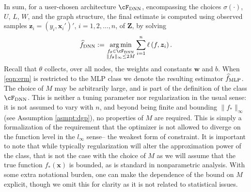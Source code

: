 \documentclass[11pt]{article}
\numberwithin{equation}{section}
\theoremstyle{definition}
\DeclareMathOperator*{\argmin}{arg\,min}
\newcommand{\R}{\mathbb{R}}
\def\argmin{\operatornamewithlimits{arg\,min}}
\newcommand{\deq}{:=}
\newcommand{\bz}{\bm{z}}
\newcommand{\bZ}{\bm{Z}}
\newcommand{\bw}{\bm{w}}
\newcommand{\bx}{\bm{x}}
\begin{document}
In sum, for a user-chosen architecture $\cF_{\rm DNN}$, encompassing the choices $\sigma(\cdot)$, $U$, $L$, $W$, and the graph structure, the final estimate is computed using observed samples $\bz_i = (y_i, \bx_i')'$, $i=1,2, \ldots, n$, of $\bZ$, by solving
\begin{align}
	\label{eqn:erm}
	\widehat{f}_{\rm DNN} \deq \argmin_{\substack{f_\theta \in \cF_{\rm DNN} \\ \| f_\theta \|_\infty \leq 2M}}  \sum_{i=1}^n \ell\left(f, \bz_i\right).
\end{align}
Recall that $\theta$ collects, over all nodes, the weights and constants $\bw$ and $b$. When \eqref{eqn:erm} is restricted to the MLP class we denote the resulting estimator $\widehat{f}_{\rm MLP}$. The choice of $M$ may be arbitrarily large, and is part of the definition of the class $\cF_{\rm DNN}$. This is neither a tuning parameter nor regularization in the usual sense: it is not assumed to vary with $n$, and beyond being finite and bounding $\|f_*\|_\infty$ (see Assumption \ref{asmpt:dgp}), no properties of $M$ are required. This is simply a formalization of the requirement that the optimizer is not allowed to diverge on the function level in the $l_\infty$ sense-- the weakest form of constraint. It is important to note that while typically regularization will alter the approximation power of the class, that is not the case with the choice of $M$ as we will assume that the true function $f_*(\bx)$ is bounded, as is standard in nonparametric analysis. With some extra notational burden, one can make the dependence of the bound on $M$ explicit, though we omit this for clarity as it is not related to statistical issues.



\end{document}

